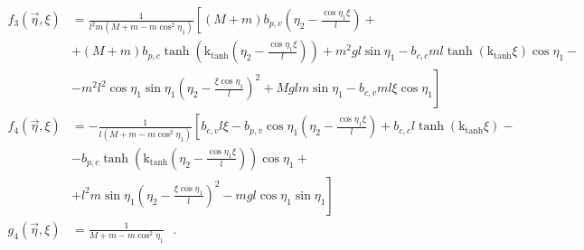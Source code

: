 \begin{align}
f_3(\vec{\eta},\xi) &= \frac{1}{ l^2 m (M + m - m \cos^2 \eta_1) }
\left[
(M + m) b_{p,v} \left(\eta_2 - \frac{\cos \eta_1 \xi}{l}\right) + \right. \nonumber \\
&+ (M + m) b_{p,c} \tanh\left(\mathrm{k}_{\mathrm{tanh}} \left(\eta_2 - \frac{ \cos \eta_1 \xi}{l}\right)\right) + m^2 g l \sin \eta_1 - b_{c,c} m l \tanh\left(\mathrm{k}_{\mathrm{tanh}} \xi\right) \cos \eta_1 - \nonumber \\
&- \left. m^2 l^2 \cos \eta_1 \sin \eta_1 \left(\eta_2 - \frac{\xi \cos \eta_1}{l}\right)^2 + M g l m \sin \eta_1 - b_{c,v} m l \xi \cos \eta_1
\right] \\
%
%
f_4(\vec{\eta},\xi) &= -\frac{1}{ l (M + m - m \cos^2 \eta_1) } \left[   b_{c,v} l \xi - b_{p,v} \cos \eta_1 \left(\eta_2 - \frac{\cos \eta_1 \xi}{l}\right) + b_{c,c} l \tanh\left(\mathrm{k}_{\mathrm{tanh}} \xi\right) - \right. \nonumber \\
&- b_{p,c} \tanh\left(\mathrm{k}_{\mathrm{tanh}} \left(\eta_2 - \frac{ \cos \eta_1 \xi}{l}\right)\right) \cos \eta_1 + \nonumber \\
&+ \left. l^2 m \sin \eta_1 \left(\eta_2 - \frac{\xi \cos \eta_1}{l}\right)^2 - m g l \cos \eta_1 \sin \eta_1  \right] \\
%
%
g_4(\vec{\eta},\xi) &= \frac{1}{M + m - m \cos^2 \eta_1 }
\ \ \ .
\label{eq:f3f4g4} \\ \nonumber
\end{align}
\endgroup \vspace{-44pt}

%
%
%
%
%
%
%
%


